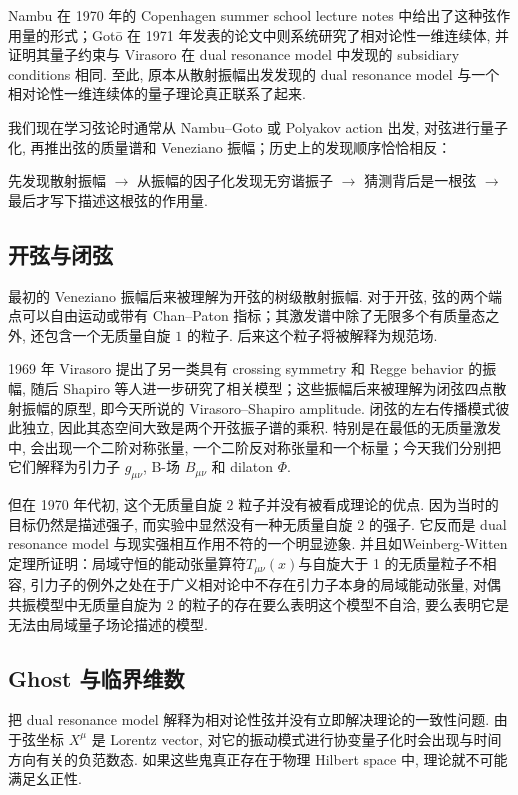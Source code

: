 \documentclass[10pt]{article}
\numberwithin{equation}{section}
\begin{document}
Nambu 在 1970 年的 Copenhagen summer school lecture notes 中给出了这种弦作用量的形式；Gotō 在 1971 年发表的论文中则系统研究了相对论性一维连续体, 并证明其量子约束与 Virasoro 在 dual resonance model 中发现的 subsidiary conditions 相同\cite{Goto1971,CappelliEtAl2012}. 至此, 原本从散射振幅出发发现的 dual resonance model 与一个相对论性一维连续体的量子理论真正联系了起来. 

我们现在学习弦论时通常从 Nambu–Goto 或 Polyakov action 出发, 对弦进行量子化, 再推出弦的质量谱和 Veneziano 振幅；历史上的发现顺序恰恰相反：

先发现散射振幅 $\rightarrow$ 从振幅的因子化发现无穷谐振子 $\rightarrow$ 猜测背后是一根弦 $\rightarrow$ 最后才写下描述这根弦的作用量. 

\subsection{开弦与闭弦}

最初的 Veneziano 振幅后来被理解为开弦的树级散射振幅. 对于开弦, 弦的两个端点可以自由运动或带有 Chan–Paton 指标；其激发谱中除了无限多个有质量态之外, 还包含一个无质量自旋 $1$ 的粒子. 后来这个粒子将被解释为规范场. 

1969 年 Virasoro 提出了另一类具有 crossing symmetry 和 Regge behavior 的振幅, 随后 Shapiro 等人进一步研究了相关模型；这些振幅后来被理解为闭弦四点散射振幅的原型, 即今天所说的 Virasoro–Shapiro amplitude\cite{Virasoro1969,Shapiro1969}. 闭弦的左右传播模式彼此独立, 因此其态空间大致是两个开弦振子谱的乘积. 特别是在最低的无质量激发中, 会出现一个二阶对称张量, 一个二阶反对称张量和一个标量；今天我们分别把它们解释为引力子 $g_{\mu\nu}$, B-场 $B_{\mu\nu}$ 和 dilaton $\Phi$. 

但在 1970 年代初, 这个无质量自旋 $2$ 粒子并没有被看成理论的优点. 因为当时的目标仍然是描述强子, 而实验中显然没有一种无质量自旋 $2$ 的强子. 它反而是 dual resonance model 与现实强相互作用不符的一个明显迹象.
并且如Weinberg-Witten定理所证明：局域守恒的能动张量算符$T_{\mu\nu}(x)$与自旋大于 1 的无质量粒子不相容, 引力子的例外之处在于广义相对论中不存在引力子本身的局域能动张量, 对偶共振模型中无质量自旋为 2 的粒子的存在要么表明这个模型不自洽, 要么表明它是无法由局域量子场论描述的模型\cite{WeinbergWitten1980}.

\subsection{Ghost 与临界维数}

把 dual resonance model 解释为相对论性弦并没有立即解决理论的一致性问题. 由于弦坐标 $X^\mu$ 是 Lorentz vector, 对它的振动模式进行协变量子化时会出现与时间方向有关的负范数态. 如果这些鬼真正存在于物理 Hilbert space 中, 理论就不可能满足幺正性. 
\end{document}
